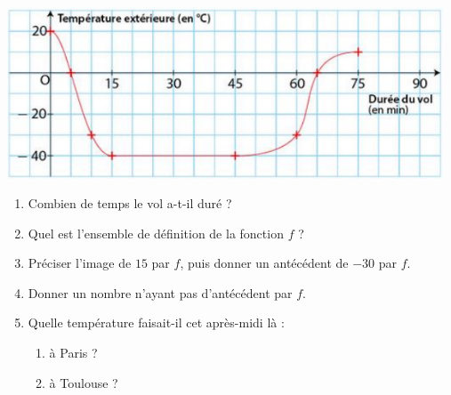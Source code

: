 \documentclass[a4paper]{article}
\begin{document}
\begin{center}
  \includegraphics[width=13cm]{7_1_mobiliser_les_acquis_sur_les_fonctions_temperature_exterieure.png}
\end{center}

\begin{enumerate}
  \item Combien de temps le vol a-t-il duré ?
  \item Quel est l'ensemble de définition de la fonction $f$ ?
  \item Préciser l'image de $15$ par $f$, puis donner un antécédent de $-30$ par $f$.
  \item Donner un nombre n'ayant pas d'antécédent par $f$.
  \item Quelle température faisait-il cet après-midi là :
    \begin{enumerate}
      \item à Paris ?
      \item à Toulouse ?
    \end{enumerate}
\end{enumerate}
\end{document}
